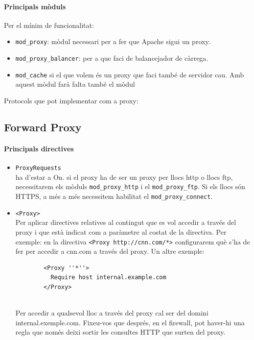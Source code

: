 \documentclass[a4paper, 11pt]{article}
\begin{document}
\paragraph{Principals mòduls \\}
Per el mínim de funcionalitat:
\begin{itemize}
	\item \verb+mod_proxy+: mòdul necessari per a fer que Apache sigui un proxy. 
	\item \verb+mod_proxy_balancer+: per a que faci de balancejador de càrrega.
	\item \verb+mod_cache+ si el que volem \'es un proxy que faci tamb\'e de servidor cau. Amb aquest mòdul farà falta tamb\'e el mòdul 
\end{itemize}

Protocols que pot implementar com a proxy:


\subsection{Forward Proxy}

\paragraph{Principals directives\\}
\begin{itemize}
	\item \verb+ProxyRequests+ \\
		ha d'estar a On. si el proxy ha de ser un proxy per llocs http o llocs ftp, necessitarem els mòduls \verb+mod_proxy_http+ i el \verb+mod_proxy_ftp+. Si els llocs són HTTPS, a m\'es a m\'es necessitem habilitat el \verb+mod_proxy_connect+.
	\item \verb+<Proxy>+\\
		Per aplicar directives relatives al contingut que es vol accedir a trav\'es del proxy i que està indicat com a paràmetre al costat de la directiva. Per exemple: en la directiva \verb+<Proxy http://cnn.com/*>+ configurarem què s'ha de fer per accedir a cnn.com a trav\'es del proxy. Un altre exemple: \\
		\begin{verbatim}
		<Proxy ''*''>
		  Require host internal.example.com
		</Proxy>
		\end{verbatim}
		\\
		Per accedir a qualsevol lloc a trav\'es del proxy cal ser del domini internal.exemple.com. Fixeu-vos que despr\'es, en el firewall, pot haver-hi una regla que nom\'es deixi sortir les consultes HTTP que surten del proxy.
\end{itemize}
\end{document}
